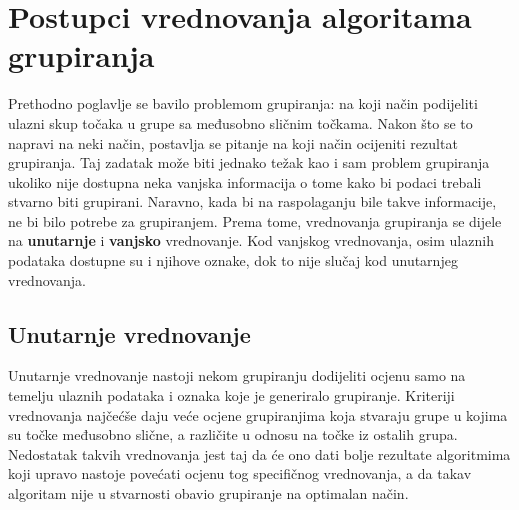 \documentclass[times, utf8, zavrsni]{fer}
\begin{document}
\chapter{Postupci vrednovanja algoritama grupiranja}
\label{evaluation}
Prethodno poglavlje se bavilo problemom grupiranja: na koji način podijeliti ulazni skup točaka u grupe sa međusobno sličnim točkama. Nakon što se to napravi na neki način, postavlja se pitanje na koji način ocijeniti rezultat grupiranja. Taj zadatak može biti jednako težak kao i sam problem grupiranja ukoliko nije dostupna neka vanjska informacija o tome kako bi podaci trebali stvarno biti grupirani. Naravno, kada bi na raspolaganju bile takve informacije, ne bi bilo potrebe za grupiranjem. Prema tome, vrednovanja grupiranja se dijele na \textbf{unutarnje}  i \textbf{vanjsko}  vrednovanje. Kod vanjskog vrednovanja, osim ulaznih podataka dostupne su i njihove oznake, dok to nije slučaj kod unutarnjeg vrednovanja.

\section{Unutarnje vrednovanje}
Unutarnje vrednovanje nastoji nekom grupiranju dodijeliti ocjenu samo na temelju ulaznih podataka i oznaka koje je generiralo grupiranje. Kriteriji vrednovanja najčećše daju veće ocjene grupiranjima koja stvaraju grupe u kojima su točke međusobno slične, a različite u odnosu na točke iz ostalih grupa. Nedostatak takvih vrednovanja jest taj da će ono dati bolje rezultate algoritmima koji upravo nastoje povećati ocjenu tog specifičnog vrednovanja, a da takav algoritam nije u stvarnosti obavio grupiranje na optimalan način.
\end{document}
